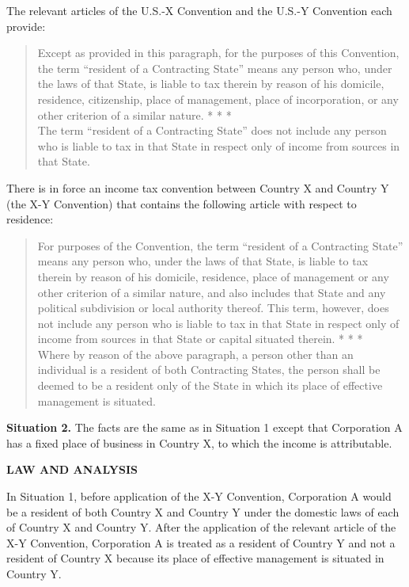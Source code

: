 \begin{select}
The relevant articles of the U.S.-X Convention and the U.S.-Y Convention each provide: 
\begin{quote}Except as provided in this paragraph, for the purposes of this Convention, the term ``resident of a Contracting State'' means any person who, under the laws of that State, is liable to tax therein by reason of his domicile, residence, citizenship, place of management, place of incorporation, or any other criterion of a similar nature. 
* * * \\
The term ``resident of a Contracting State'' does not include any person who is liable to tax in that State in respect only of income from sources in that State.
\end{quote}
There is in force an income tax convention between Country X and Country Y (the X-Y Convention) that contains the following article with respect to residence: 
\begin{quote}
For purposes of the Convention, the term ``resident of a Contracting State'' means any 
person who, under the laws of that State, is liable to tax therein by reason of his 
domicile, residence, place of management or any other criterion of a similar nature, and also includes that State and any political subdivision or local authority thereof. This term, however, does not include any person who is liable to tax in that State in respect only of income from sources in that State or capital situated therein. 
* * * \\
Where by reason of the above paragraph, a person other than an individual is a resident of both Contracting States, the person shall be deemed to be a resident only of the State in which its place of effective management is situated.
\end{quote}

\textbf{Situation 2.}  The facts are the same as in Situation 1 except that Corporation A has a fixed place of business in Country X, to which the income is attributable. 

\begin{center}\textbf{LAW AND ANALYSIS}
\end{center} 
In Situation 1, before application of the X-Y Convention, Corporation A would be a resident of both Country X and Country Y under the domestic laws of each of Country X and Country Y. After the application of the relevant article of the X-Y Convention, Corporation A is treated as a resident of Country Y and not a resident of Country X because its place of effective management is situated in Country Y. 


\end{select}
